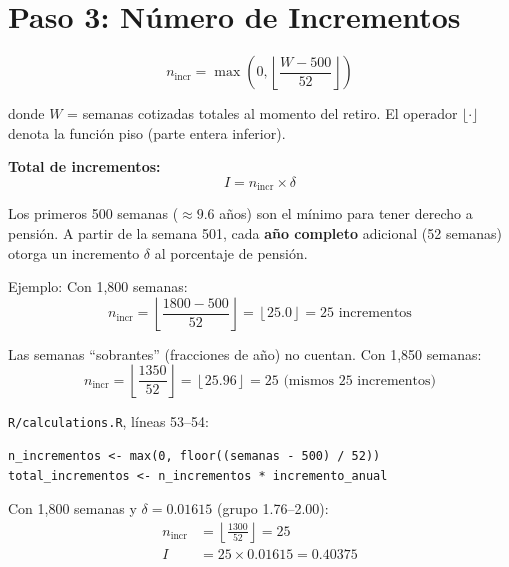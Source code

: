 \documentclass[11pt,a4paper]{report}
\theoremstyle{remark}
\begin{document}
\section{Paso 3: N\'umero de Incrementos}

\begin{tcolorbox}[colback=blue!5!white, colframe=blue!75!black, title=\textbf{Definici\'on Formal}]
\begin{equation}
n_{\text{incr}} = \max\left(0, \left\lfloor \frac{W - 500}{52} \right\rfloor\right)
\label{eq:n_incrementos}
\end{equation}

donde $W$ = semanas cotizadas totales al momento del retiro. El operador $\lfloor \cdot \rfloor$ denota la funci\'on piso (parte entera inferior).

\textbf{Total de incrementos:}
\begin{equation}
I = n_{\text{incr}} \times \delta
\end{equation}
\end{tcolorbox}

\begin{tcolorbox}[colback=green!5!white, colframe=green!50!black, title=\textbf{Intuici\'on}]
Los primeros 500 semanas ($\approx 9.6$ a\~nos) son el m\'inimo para tener derecho a pensi\'on. A partir de la semana 501, cada \textbf{a\~no completo} adicional (52 semanas) otorga un incremento $\delta$ al porcentaje de pensi\'on.

Ejemplo: Con 1,800 semanas:
\[
n_{\text{incr}} = \left\lfloor \frac{1800 - 500}{52} \right\rfloor = \left\lfloor 25.0 \right\rfloor = 25 \text{ incrementos}
\]

Las semanas ``sobrantes'' (fracciones de a\~no) no cuentan. Con 1,850 semanas:
\[
n_{\text{incr}} = \left\lfloor \frac{1350}{52} \right\rfloor = \left\lfloor 25.96 \right\rfloor = 25 \text{ (mismos 25 incrementos)}
\]
\end{tcolorbox}

\begin{tcolorbox}[colback=orange!5!white, colframe=orange!75!black, title=\textbf{Aplicaci\'on en C\'odigo}]
\texttt{R/calculations.R}, l\'ineas 53--54:
\begin{lstlisting}
n_incrementos <- max(0, floor((semanas - 500) / 52))
total_incrementos <- n_incrementos * incremento_anual
\end{lstlisting}

Con 1,800 semanas y $\delta = 0.01615$ (grupo 1.76--2.00):
\begin{align*}
n_{\text{incr}} &= \left\lfloor \frac{1300}{52} \right\rfloor = 25 \\
I &= 25 \times 0.01615 = 0.40375
\end{align*}
\end{tcolorbox}
\end{document}
